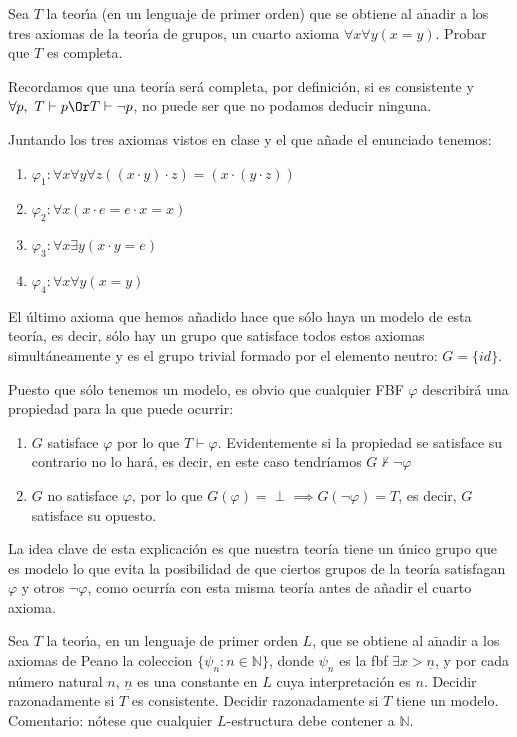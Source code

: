 \begin{problem} 
Sea $T$ la teor\'{\i}a (en un lenguaje de primer orden) 
que se obtiene al a$\operatorname{\tilde{n}}$adir a los tres axiomas de la teor\'{\i}a de  grupos,
un cuarto axioma $\forall x\forall y (x = y)$. Probar que $T$ es completa.
\solution


Recordamos que una teoría será completa, por definición, si es consistente y $\forall p, \ T \vdash p \Or T\vdash \neg p$, no puede ser que no podamos deducir ninguna.

Juntando los tres axiomas vistos en clase y el que añade el enunciado tenemos:
\begin{enumerate}
\item $\varphi_1: \forall x\forall y\forall z ((x\cdot y)\cdot z) = (x\cdot(y\cdot z))$
\item $\varphi_2: \forall x(x\cdot e = e\cdot x = x)$
\item $\varphi_3: \forall x\exists y (x\cdot y = e)$
\item $\varphi_4: \forall x\forall y (x=y)$
\end{enumerate}

El último axioma que hemos añadido hace que sólo haya un modelo de esta teoría, es decir, sólo hay un grupo que satisface todos estos axiomas simultáneamente y es el grupo trivial formado por el elemento neutro: $G=\{id\}$.

Puesto que sólo tenemos un modelo, es obvio que cualquier FBF $\varphi$ describirá una propiedad para la que puede ocurrir:
\begin{enumerate}
\item $G$ satisface $\varphi$ por lo que $T \vdash \varphi $. Evidentemente si la propiedad se satisface su contrario no lo hará, es decir, en este caso tendríamos $G \nvdash \neg \varphi$
\item $G$ no satisface $\varphi$, por lo que $G(\varphi) = \perp \implies G(\neg \varphi) = T$, es decir, $G$ satisface su opuesto.
\end{enumerate}

La idea clave de esta explicación es que nuestra teoría tiene un único grupo que es modelo lo que evita la posibilidad de que ciertos grupos de la teoría satisfagan $\varphi$ y otros $\neg \varphi$, como ocurría con esta misma teoría antes de añadir el cuarto axioma.
\end{problem}

\begin{problem} Sea $T$ la teor\'{\i}a, 
 en un lenguaje de primer orden  $L$, que se obtiene al a$\operatorname{\tilde{n}}$adir a los
axiomas de Peano la coleccion $\{ \psi_n: n\in\mathbb{N}\}$, donde
$\psi_n$ es la fbf $\exists x > \underline{n}$,  y  por cada n\'umero natural $n$,  $ \underline{n}$ es una constante
en $L$ cuya interpretaci\'on es $n$.
 Decidir razonadamente si 
$T$ es consistente. Decidir razonadamente si $T$ tiene un modelo. Comentario: n\'otese que  cualquier
$L$-estructura debe contener a $\mathbb{N}$.
\solution

\end{problem}